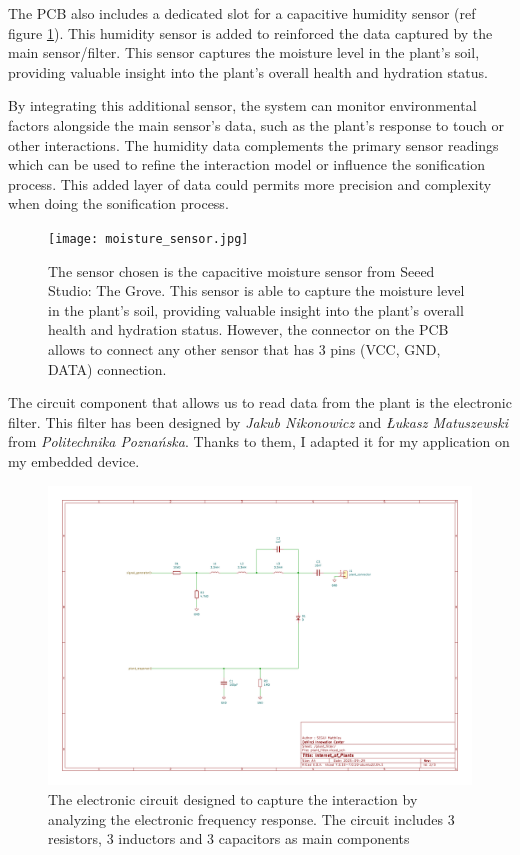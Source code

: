 The PCB also includes a dedicated slot for a capacitive humidity sensor (ref figure \ref{fig:moisture_sensor}). This humidity sensor is added to reinforced the data captured by the main sensor/filter. This sensor captures the moisture level in the plant's soil, providing valuable insight into the plant's overall health and hydration status.

By integrating this additional sensor, the system can monitor environmental factors alongside the main sensor's data, such as the plant's response to touch or other interactions. The humidity data complements the primary sensor readings which can be used to refine the interaction model or influence the sonification process. This added layer of data could permits more precision and complexity when doing the sonification process.

\begin{figure}[h]
    \centering
    \texttt{[image: moisture\_sensor.jpg]}
    \caption{The sensor chosen is the capacitive moisture sensor from Seeed Studio: The Grove. This sensor is able to capture the moisture level in the plant's soil, providing valuable insight into the plant's overall health and hydration status. However, the connector on the PCB allows to connect any other sensor that has 3 pins (VCC, GND, DATA) connection.}
    \vspace{0.1cm}
    \label{fig:moisture_sensor}
\end{figure}


The circuit component that allows us to read data from the plant is the electronic filter.
This filter has been designed by \textit{Jakub Nikonowicz} and \textit{Łukasz Matuszewski}
from \textit{Politechnika Poznańska}.
Thanks to them, I adapted it for my application on my embedded device.

\begin{figure}[H]
    \centering
    \includegraphics[width=\textwidth]{images/iop-plant_filter.pdf}
    \caption{The electronic circuit designed to capture the interaction by analyzing the electronic
        frequency response. The circuit includes 3 resistors, 3 inductors and 3 capacitors as main components}
    \vspace{0.1cm}
    \label{fig:iop_schematic_filter}
\end{figure}

